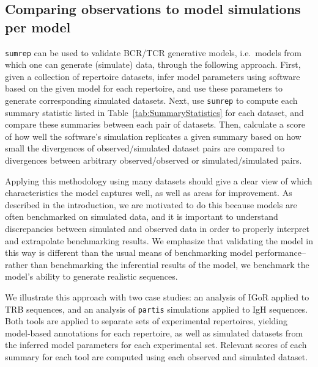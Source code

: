 \documentclass{article}
\begin{document}
\subsection*{Comparing observations to model simulations per model}
\texttt{sumrep} can be used to validate BCR/TCR generative models, i.e.\ models from which one can generate (simulate) data, through the following approach.
First, given a collection of repertoire datasets, infer model parameters using software based on the given model for each repertoire, and use these parameters to generate corresponding simulated datasets.
Next, use \texttt{sumrep} to compute each summary statistic listed in Table~\ref{tab:SummaryStatistics} for each dataset, and compare these summaries between each pair of datasets.
Then, calculate a score of how well the software's simulation replicates a given summary based on how small the divergences of observed/simulated dataset pairs are compared to divergences between arbitrary observed/observed or simulated/simulated pairs.

Applying this methodology using many datasets should give a clear view of which characteristics the model captures well, as well as areas for improvement.
As described in the introduction, we are motivated to do this because models are often benchmarked on simulated data, and it is important to understand discrepancies between simulated and observed data in order to properly interpret and extrapolate benchmarking results.
We emphasize that validating the model in this way is different than the usual means of benchmarking model performance-- rather than benchmarking the inferential results of the model, we benchmark the model's ability to generate realistic sequences.

We illustrate this approach with two case studies:
an analysis of IGoR \cite{Marcou2018-du} applied to TRB sequences, and an analysis of \texttt{partis}\cite{Ralph2016-nw, Ralph2016-iz} simulations applied to IgH sequences.
Both tools are applied to separate sets of experimental repertoires, yielding model-based annotations for each repertoire, as well as simulated datasets from the inferred model parameters for each experimental set.
Relevant scores of each summary for each tool are computed using each observed and simulated dataset.

\end{document}
